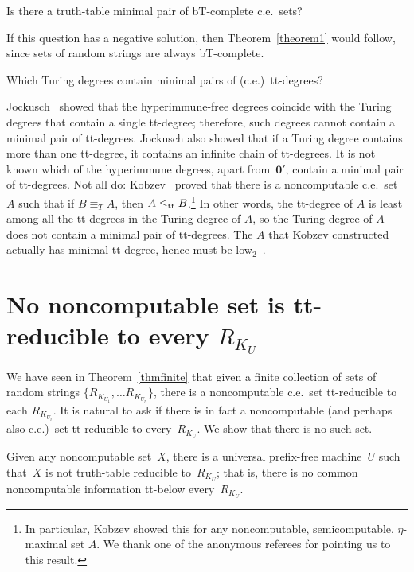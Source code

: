 \documentclass{LMCS}
\newcommand{\0}{\mathbf{0}}
\newcommand{\ce}{c.e.\ }
\newcommand{\<}{\langle}
\renewcommand{\>}{\rangle}
\begin{document}
\begin{qu}
Is there a truth-table minimal pair of bT-complete \ce sets?
\end{qu}

If this question has a negative solution, then Theorem~\ref{theorem1} would
follow, since sets of random strings are always bT-complete.

\begin{qu}
Which Turing degrees contain minimal pairs of (c.e.)\ tt-degrees?
\end{qu}

Jockusch~\cite{Jockusch} showed that the hyperimmune-free degrees coincide
with the Turing degrees that contain a single tt-degree; therefore, such
degrees cannot contain a minimal pair of tt-degrees. Jockusch also showed
that if a Turing degree contains more than one tt-degree, it contains an
infinite chain of tt-degrees. It is not known which of the hyperimmune
degrees, apart from~$\0'$, contain a minimal pair of tt-degrees. Not all do:
Kobzev~\cite{Kobzev} proved that there is a noncomputable c.e.\ set $A$ such
that if $B\equiv_T A$, then $A\leq_{\rm tt} B$.\footnote{In particular,
Kobzev showed this for any noncomputable, semicomputable, $\eta$-maximal set
$A$. We thank one of the anonymous referees for pointing us to this result.}
In other words, the tt-degree of $A$ is least among all the tt-degrees in the
Turing degree of $A$, so the Turing degree of $A$ does not contain a minimal
pair of tt-degrees. The $A$ that Kobzev constructed actually has minimal
tt-degree, hence must be low$_2$~\cite{DS}.

\section{\texorpdfstring{No noncomputable set is tt-reducible to every
$R_{K_U}$}{No noncomputable set is tt-reducible to every U-random set}}
\label{sec_X}

We have seen in Theorem~\ref{thmfinite} that given a finite collection of
sets of random strings $\{R_{K_{U_1}},\ldots R_{K_{U_n}}\}$, there is a
noncomputable \ce set tt-reducible to each $R_{K_{U_i}}$.  It is natural to
ask if there is in fact a noncomputable (and perhaps also c.e.)\ set
tt-reducible to every~$R_{K_U}$.  We show that there is no such set.

\begin{thm}\label{knight-bishop}
Given any noncomputable set~$X$, there is a universal prefix-free
machine~${U}$ such that~$X$ is not truth-table reducible to~$R_{K_{U}}$; that
is, there is no common noncomputable information tt-below every~$R_{K_{U}}$.
\end{thm}
\end{document}
